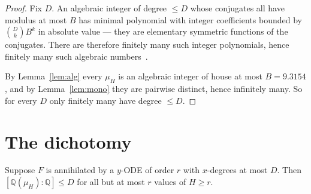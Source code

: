 \documentclass[11pt]{article}
\newcommand{\Q}{\mathbb{Q}}
\begin{document}
\begin{proof}
Fix $D$. An algebraic integer of degree $\le D$ whose conjugates all have modulus
at most $B$ has minimal polynomial with integer coefficients bounded by
$\binom{D}{k}B^k$ in absolute value --- they are elementary symmetric functions
of the conjugates. There are therefore finitely many such integer polynomials,
hence finitely many such algebraic numbers~\cite{northcott1949,kronecker1857}.

By Lemma~\ref{lem:alg} every $\mu_H$ is an algebraic integer of house at most
$B = 9.3154$, and by Lemma~\ref{lem:mono} they are pairwise distinct, hence
infinitely many. So for every $D$ only finitely many have degree $\le D$.
\end{proof}

\section{The dichotomy}

\begin{theorem}[dichotomy]
\label{thm:dichotomy}
Suppose $F$ is annihilated by a $y$-ODE of order $r$ with $x$-degrees at most
$D$. Then $[\Q(\mu_H):\Q] \le D$ for all but at most $r$ values of $H \ge r$.
\end{theorem}
\end{document}
